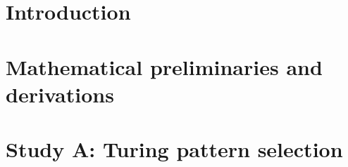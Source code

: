 \documentclass[12pt]{article}
\begin{document}
\begin{abstract}
(iv) show that positional decodability from Hb+Eve expression improves with
maternal \emph{bcd} dosage (6.21\% vs.\ 9.91\% EL median error; bootstrap CI
$[3.00,4.40]\%$ EL). Two headline measurements tie the studies together: a \emph{developmental fragility index}
for the segment-polarity network ($F=0.500$; exactly half of all 1{,}792 single-node perturbations of
wild-type-basin states destroy the wild-type outcome, concentrated in seven synchronous-sensitive nodes including wg, ci and en, with seven initial-state restrictions that yield zero wg-ON fixed-point outcomes and six with twice the unrestricted conditional fraction; these are not maintained clamps) and a \emph{restricted-input
comparison} for supervised morphogen decoding (cephalic-furrow position is decodable below the published benchmark
from a single measured point of the Bicoid gradient, 4.29\% vs 4.94\% EL for the true-dose comparator). The measured-amplitude comparator in the same benchmark has lower RMSE, 2.8566\% EL, so the one-point result does not beat all threshold alternatives. Negative results (a retracted small-sample surrogate win,
single-exponential sufficiency, degenerate basin classification) are reported
alongside positive ones, each with its positive interpretation. All code, tests, data manifests and result files are
public at the project repository.
\end{abstract}
\tableofcontents
\newpage
\section{Introduction}

\section{Mathematical preliminaries and derivations}

\section{Study A: Turing pattern selection}

\end{document}
